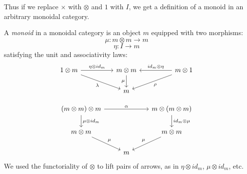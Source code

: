 \documentclass[DaoFP]{subfiles}
\begin{document}
Thus if we replace $\times$ with $\otimes$ and $1$ with $I$, we get a definition of a monoid in an arbitrary monoidal category. 

A \emph{monoid} in a monoidal category is an object $m$ equipped with two morphisms:
\[ \mu \colon m \otimes m \to m \]
\[ \eta \colon I \to m \]
satisfying the unit and associativity laws:
\[
 \begin{tikzcd}
 1 \otimes m
 \arrow[rr, "\eta \otimes id_m"]
 \arrow[rrd, "\lambda"']
& & m \otimes m
 \arrow[d, "\mu"']
&& m \otimes 1
 \arrow[ll, "id_m \otimes \eta"']
 \arrow[lld, "\rho"]
 \\
 && m
  \end{tikzcd}
\]

\[
 \begin{tikzcd}
 (m \otimes m) \otimes m 
 \arrow[rr, "\alpha"]
 \arrow[d, "\mu \otimes id_m"]
 &&
 m \otimes (m \otimes m)
 \arrow[d, "id_m \otimes \mu"]
 \\
 m \otimes m 
 \arrow[dr, "\mu"]
& & m \otimes m
 \arrow[dl, "\mu"']
 \\
&  m
 \end{tikzcd}
\]
We used the functoriality of $\otimes$ to lift pairs of arrows, as in $\eta \otimes id_m$, $\mu \otimes id_m$, etc.
\end{document}
